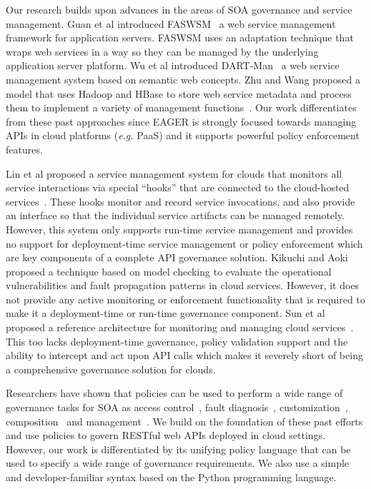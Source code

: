 Our research builds upon advances in the areas of SOA governance and
service management. 
Guan et al introduced FASWSM~\cite{1607141} a web service management
framework for application servers. FASWSM uses an adaptation technique that
wraps web services in a way so they can be managed by the underlying
application server platform. Wu et al introduced DART-Man~\cite{1504267} a web
service management system based on semantic web concepts.  Zhu and Wang
proposed a model that uses Hadoop and HBase to store web service metadata and
process them to implement a variety of management functions~\cite{5959326}.
Our work differentiates 
from these past approaches since EAGER is strongly focused
towards managing APIs in cloud platforms ({\em e.g.} PaaS) and it supports powerful
policy enforcement features.

Lin et al proposed a service management system for clouds that monitors all
service interactions via special ``hooks'' that are connected to the
cloud-hosted services~\cite{5616981}. These hooks monitor and record service
invocations, and also provide an interface so that the individual service
artifacts can be managed remotely. However, this system only supports run-time
service management and provides no support for deployment-time service
management or policy enforcement which are key components of a complete API
governance solution. Kikuchi and Aoki~\cite{6525502} proposed a technique
based on model checking to evaluate the operational vulnerabilities and fault
propagation patterns in cloud services. However, it does not provide any
active monitoring or enforcement functionality that is required to make it a
deployment-time or run-time governance component. Sun et al proposed a
reference architecture for monitoring and managing cloud
services~\cite{5579654}. This too lacks deployment-time governance, policy
validation support and the ability to intercept and act upon API calls which
makes it severely short of being a comprehensive governance solution for
clouds.

Researchers have shown that policies can be
used to perform a wide range of governance tasks for SOA as access
control~\cite{4279630,5713420}, fault diagnosis~\cite{6154236},
customization~\cite{4027138},
composition~\cite{1592403,Erradi:2006:PMS:1515984.1515990} and
management~\cite{Suleiman:2009:IUM:1564601.1564730,6481237,4028029}. We build
on the foundation of these past efforts and use policies to govern
RESTful web APIs deployed in cloud settings. 
However, our work is differentiated by
its unifying policy language that can be
used to specify a wide range of governance requirements. We also use a simple
and developer-familiar syntax based on the Python programming language.

